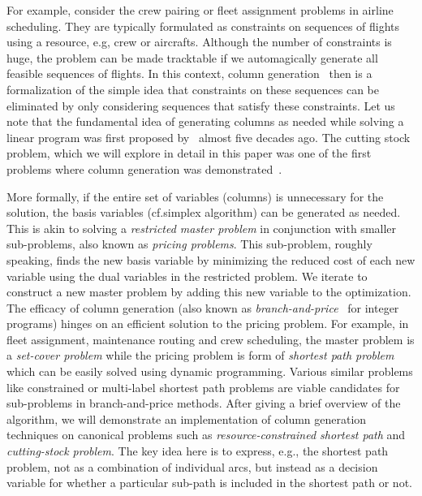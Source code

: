 \documentclass[letterpaper, 10pt, twocolumn, reqno]{amsart}
\begin{document}
For example, consider the crew pairing or fleet assignment problems in airline scheduling. They are typically formulated as constraints on sequences of flights using a resource, e.g, crew or aircrafts. Although the number of constraints is huge, the problem can be made tracktable if we automagically generate all feasible sequences of flights. In this context, column generation~\cite{desrosiers2005primer} then is a formalization of the simple idea that constraints on these sequences can be eliminated by only considering sequences that satisfy these constraints. Let us note that the fundamental idea of generating columns as needed while solving a linear program was first proposed by~\cite{dantzig1960decomposition} almost five decades ago. The cutting stock problem, which we will explore in detail in this paper was one of the first problems where column generation was demonstrated~\cite{gilmore1961linear,gilmore1963linear}.

More formally, if the entire set of variables (columns) is unnecessary for the solution, the basis variables (cf.\@ simplex algorithm) can be generated as needed. This is akin to solving a \emph{restricted master problem} in conjunction with smaller sub-problems, also known as \emph{pricing problems}. This sub-problem, roughly speaking, finds the new basis variable by minimizing the reduced cost of each new variable using the dual variables in the restricted problem. We iterate to construct a new master problem by adding this new variable to the optimization. The efficacy of column generation (also known as \emph{branch-and-price}~\cite{barnhart1998branch} for integer programs) hinges on an efficient solution to the pricing problem. For example, in fleet assignment, maintenance routing and crew scheduling, the master problem is a \emph{set-cover problem} while the pricing problem is form of \emph{shortest path problem} which can be easily solved using dynamic programming. Various similar problems like constrained or multi-label shortest path problems are viable candidates for sub-problems in branch-and-price methods. After giving a brief overview of the algorithm, we will demonstrate an implementation of column generation techniques on canonical problems such as \emph{resource-constrained shortest path} and \emph{cutting-stock problem}. The key idea here is to express, e.g., the shortest path problem, not as a combination of individual arcs, but instead as a decision variable for whether a particular sub-path is included in the shortest path or not.
\end{document}
